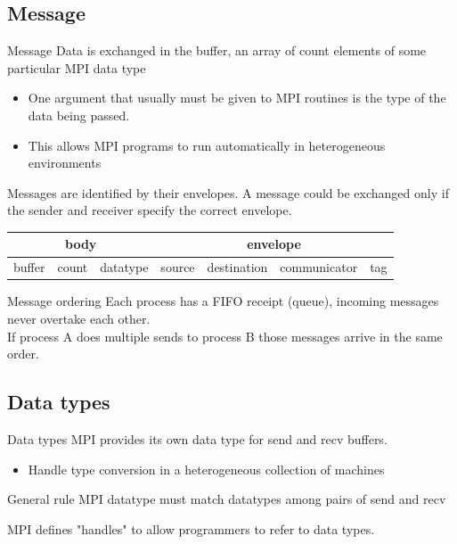 \documentclass[aspectratio=43]{beamer}
\begin{document}
\subsection{Message}
\begin{frame}{Message}
\justifying
Data is exchanged in the buffer, an array of count elements of some particular MPI data type
\begin{itemize}
\item One argument that usually must be given to MPI routines is the type of the data being passed.
\item This allows MPI programs to run automatically in heterogeneous environments
\end{itemize}
Messages are identified by their envelopes. A message could be exchanged only if the sender and receiver specify the correct envelope.\\[5mm]
\begin{tabular}{|c|c|c||c|c|c|c|}
\hline
\multicolumn{3}{|c||}{body} & \multicolumn{4}{c|}{envelope} \\\hline
buffer & count & datatype & source & destination & communicator & tag\\\hline
\end{tabular}
\end{frame}

\begin{frame}{Message ordering}
\justifying
Each process has a FIFO receipt (queue), incoming messages never overtake each other.\\[5mm]

If process A does multiple sends to process B those messages arrive in the same order.
\end{frame}

\subsection{Data types}
\begin{frame}{Data types}
MPI provides its own data type for send and recv buffers.
\begin{itemize}
\item Handle type conversion in a heterogeneous collection of machines
\end{itemize}
\begin{red1block}{General rule}
MPI datatype must match datatypes among pairs of send and recv
\end{red1block}
MPI defines "handles" to allow programmers to refer to data types.
\end{frame}
\end{document}
